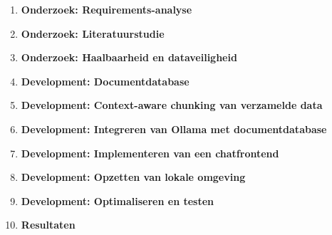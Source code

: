 \begin{enumerate}
    \item \textbf{Onderzoek: Requirements-analyse}
    \item \textbf{Onderzoek: Literatuurstudie}
    \item \textbf{Onderzoek: Haalbaarheid en dataveiligheid} 

    \item \textbf{Development: Documentdatabase}
    \item \textbf{Development: Context-aware chunking van verzamelde data}
    \item \textbf{Development: Integreren van Ollama met documentdatabase}
    \item \textbf{Development: Implementeren van een chatfrontend}
    \item \textbf{Development: Opzetten van lokale omgeving}
    \item \textbf{Development: Optimaliseren en testen}  

    \item \textbf{Resultaten}
\end{enumerate} 



